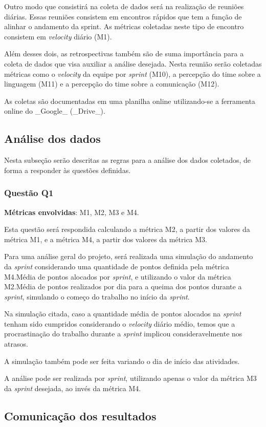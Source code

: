       Outro modo que consistirá na coleta de dados será na realização de reuniões diárias. Essas reuniões consistem em encontros rápidos que tem a função de alinhar o andamento da sprint. As métricas coletadas neste tipo de encontro consistem em \textit{velocity} diário (M1).

      Além desses dois, as retrospectivas também são de suma importância para a coleta de dados que visa auxiliar a análise desejada. Nesta reunião serão coletadas métricas como o \textit{velocity} da equipe por \textit{sprint} (M10), a percepção do time sobre a linguagem (M11) e a percepção do time sobre a comunicação (M12).

      As coletas são documentadas em uma planilha online utilizando-se a ferramenta online do _Google_ (_Drive_).

      \subsection{Análise dos dados}

      	Nesta subseção serão descritas as regras para a análise dos dados coletados, de forma a responder às questões definidas.

      	\subsubsection{Questão Q1}

      		\textbf{Métricas envolvidas}: M1, M2, M3 e M4.

      		Esta questão será respondida calculando a métrica M2, a partir dos valores da métrica M1, e a métrica M4, a partir dos valores
      		da métrica M3.

      		Para uma análise geral do projeto, será realizada uma simulação do andamento da \textit{sprint} considerando uma quantidade de
      		pontos definida pela métrica M4.Média de pontos alocados por \textit{sprint}, e utilizando o valor da métrica M2.Média de pontos realizados por dia para a queima dos pontos durante a \textit{sprint}, simulando o começo do trabalho no início da \textit{sprint}.

      		Na simulação citada, caso a quantidade média de pontos alocados na \textit{sprint} tenham sido cumpridos considerando
      		o \textit{velocity} diário médio, temos que a procrastinação do trabalho durante a \textit{sprint} implicou
      		consideravelmente nos atrasos.

      		A simulação também pode ser feita variando o dia de início das atividades.

      		A análise pode ser realizada por \textit{sprint}, utilizando apenas o valor da métrica M3 da \textit{sprint} desejada, ao invés da métrica M4.

      \subsection{Comunicação dos resultados}